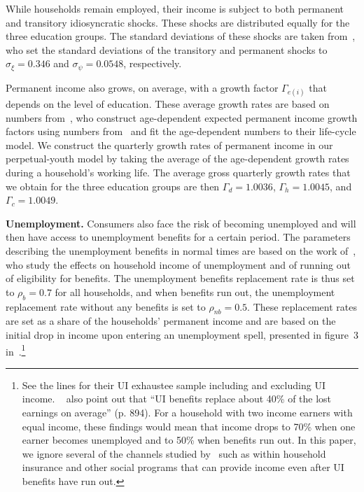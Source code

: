 \documentclass[qe,draft]{econsocart}
\theoremstyle{plain}
\theoremstyle{definition}
\begin{document}
While households remain employed, their income is subject to both permanent and transitory idiosyncratic shocks.
These shocks are distributed equally for the three education groups.
The standard deviations of these shocks are taken from~\cite{carroll2020sticky}, who set the standard deviations of the transitory and permanent shocks to $\sigma_\xi=0.346$ and $\sigma_\psi=0.0548$, respectively.

Permanent income also grows, on average, with a growth factor $\Gamma_{e(i)}$ that depends on the level of education.
These average growth rates are based on numbers from~\cite{carroll2020modeling}, who construct age-dependent expected permanent income growth factors using numbers from~\cite{cagetti2003wealth} and fit the age-dependent numbers to their life-cycle model.
We construct the quarterly growth rates of permanent income in our perpetual-youth model by taking the average of the age-dependent growth rates during a household's working life.
The average gross quarterly growth rates that we obtain for the three education groups are then $\Gamma_d=1.0036$, $\Gamma_h=1.0045$, and $\Gamma_c=1.0049$.

\textbf{Unemployment.} Consumers also face the risk of becoming unemployed and will then have access to unemployment benefits for a certain period.
The parameters describing the unemployment benefits in normal times are based on the work of~\cite{rothstein2017scraping}, who study the effects on household income of unemployment and of running out of eligibility for benefits.
The unemployment benefits replacement rate is thus set to $\rho_b=0.7$ for all households, and when benefits run out, the unemployment replacement rate without any benefits is set to $\rho_{nb}=0.5$.
These replacement rates are set as a share of the households' permanent income and are based on the initial drop in income upon entering an unemployment spell, presented in figure~3 in~\cite{rothstein2017scraping}.\footnote{See the lines for their UI exhaustee sample including and excluding UI income.
  ~\cite{rothstein2017scraping} also point out that ``UI benefits replace about 40\% of the lost earnings on average'' (p. 894).
  For a household with two income earners with equal income, these findings would mean that income drops to 70\% when one earner becomes unemployed and to 50\% when benefits run out.
  In this paper, we ignore several of the channels studied by~\cite{rothstein2017scraping} such as within household insurance and other social programs that can provide income even after UI benefits have run out.}
\end{document}
